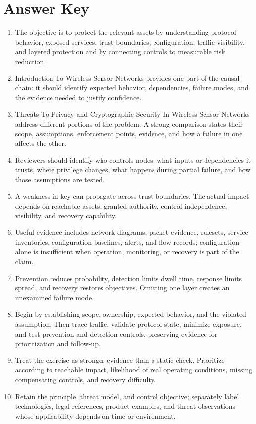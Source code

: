 \documentclass[11pt,letterpaper]{article}
\begin{document}
\section*{Answer Key}
\begin{enumerate}
\item The objective is to protect the relevant assets by understanding protocol behavior, exposed services, trust boundaries, configuration, traffic visibility, and layered protection and by connecting controls to measurable risk reduction.
\item Introduction To Wireless Sensor Networks provides one part of the causal chain: it should identify expected behavior, dependencies, failure modes, and the evidence needed to justify confidence.
\item Threats To Privacy and Cryptographic Security In Wireless Sensor Networks address different portions of the problem. A strong comparison states their scope, assumptions, enforcement points, evidence, and how a failure in one affects the other.
\item Reviewers should identify who controls nodes, what inputs or dependencies it trusts, where privilege changes, what happens during partial failure, and how those assumptions are tested.
\item A weakness in key can propagate across trust boundaries. The actual impact depends on reachable assets, granted authority, control independence, visibility, and recovery capability.
\item Useful evidence includes network diagrams, packet evidence, rulesets, service inventories, configuration baselines, alerts, and flow records; configuration alone is insufficient when operation, monitoring, or recovery is part of the claim.
\item Prevention reduces probability, detection limits dwell time, response limits spread, and recovery restores objectives. Omitting one layer creates an unexamined failure mode.
\item Begin by establishing scope, ownership, expected behavior, and the violated assumption. Then trace traffic, validate protocol state, minimize exposure, and test prevention and detection controls, preserving evidence for prioritization and follow-up.
\item Treat the exercise as stronger evidence than a static check. Prioritize according to reachable impact, likelihood of real operating conditions, missing compensating controls, and recovery difficulty.
\item Retain the principle, threat model, and control objective; separately label technologies, legal references, product examples, and threat observations whose applicability depends on time or environment.
\end{enumerate}
\end{document}
